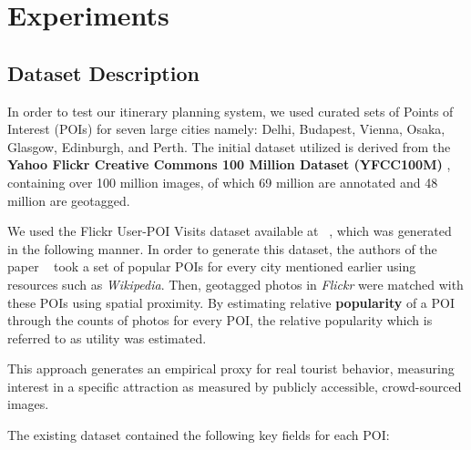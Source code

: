 \section{Experiments}

\subsection{Dataset Description}
In order to test our itinerary planning system, we used curated sets of Points of Interest (POIs) for seven large cities namely: Delhi, Budapest, Vienna, Osaka, Glasgow, Edinburgh, and Perth. The initial dataset utilized is derived from the \textbf{Yahoo Flickr Creative Commons 100 Million Dataset (YFCC100M)} \cite{}, containing over 100 million images, of which 69 million are annotated and 48 million are geotagged. 

We used the Flickr User-POI Visits dataset available at ~\cite{limkwanhuiDataCode},  which was generated in the following manner. In order to generate this dataset, the authors of the paper ~\cite{taylor2018tour} took a set of popular POIs for every city mentioned earlier using resources such as \textit{Wikipedia}. Then, geotagged photos in \textit{Flickr} were matched with these POIs using spatial proximity. By estimating relative \textbf{popularity} of a POI through the counts of photos for every POI, the relative popularity which is referred to as utility was estimated.

This approach generates an empirical proxy for real tourist behavior, measuring interest in a specific attraction as measured by publicly accessible, crowd-sourced images.

The existing dataset contained the following key fields for each POI:

